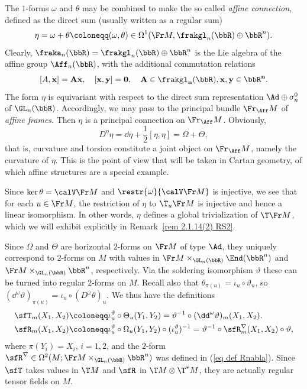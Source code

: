 \begin{rem}\label{rem 2.1.14(1) RS2}
    The $1$-forms $\omega$ and $\theta$  may be combined to make the so called \emph{affine connection}, defined as the direct sum (usually written as a regular sum)
    \[\eta=\omega+\theta\coloneqq (\omega,\theta)\in \Omega^1(\Fr M,\frakgl_n(\bbR)\oplus\bbR^n).\]
    Clearly, $\fraka_n(\bbR)=\frakgl_n(\bbR)\oplus \bbR^n$ is the Lie algebra of the affine group $\Aff_n(\bbR)$, with the additional commutation relations
    \[[A,\bf{x}]=A\bf{x},\quad [\bf{x},\bf{y}]=0,\quad A\in\frakgl_n(\bbR),\bf{x},\bf{y}\in\bbR^n.\]
    The form $\eta$ is equivariant with respect to the direct sum representation $\Ad\oplus \sigma_n^0$ of $\GL_n(\bbR)$. Accordingly, we may pass to the principal bundle $\Fr_{\Aff} M$ of \emph{affine frames}. Then $\eta$ is a principal connection on $\Fr_{\Aff}M$. Obviously,
    \[D^\eta\eta=\dd \eta+\frac12[\eta,\eta]=\Omega+\Theta,\]
    that is, curvature and torsion constitute a joint object on $\Fr_{\Aff} M$, namely the curvature of $\eta$. This is the point of view that will be taken in Cartan geometry, of which affine structures are a special example.

    Since $\ker\theta=\calV \Fr M$ and $\restr{\omega}{\calV \Fr M}$ is injective, we see that for each $u\in\Fr M$, the restriction of $\eta$ to $\T_u \Fr M$ is injective and hence a linear isomorphism. In other words, $\eta$ defines a global trivialization of $\T\Fr M$, which we will exhibit explicitly in Remark~\ref{rem 2.1.14(2) RS2}.
\end{rem}

Since $\Omega$ and $\Theta$ are horizontal $2$-forms on $\Fr M$ of type $\Ad$, they uniquely correspond to $2$-forms on $M$ with values in $\Fr M\times_{\GL_n(\bbR)}\End(\bbR^n)$ and $\Fr M\times_{\GL_n(\bbR)}\bbR^n$, respectively. Via the soldering isomorphism $\vartheta$ these can be turned into regular $2$-forms on $M$. Recall also that $\theta_{\pi(u)}=\iota_u\circ \vartheta_u$, so $(\dd^\omega \vartheta)_{\pi(u)}=\iota_u\circ (D^\omega\theta)_u$. We thus have the definitions
\begin{align}
    \sfT_m(X_1,X_2)\coloneqq &\iota_u^\vartheta\circ \Theta_u(Y_1,Y_2)=\vartheta^{-1}\circ (\dd^\omega \vartheta)_m(X_1,X_2).\\
    \sfR_m(X_1,X_2)\coloneqq & \iota_u^\vartheta\circ \Omega_u(Y_1,Y_2)\circ (\iota_u^\vartheta)^{-1}=\vartheta^{-1}\circ \sfR^\nabla_m(X_1,X_2)\circ \vartheta,
\end{align}
where $\pi(Y_i)=X_i$, $i=1,2$, and the $2$-form $\sfR^\nabla\in\Omega^2(M;\Fr M\times_{\GL_n(\bbR)}\bbR^n)$ was defined in (\ref{eq def Rnabla}). Since $\sfT$ takes values in $\T M$ and $\sfR$ in $\T M\otimes \T^\ast M$, they are actually regular tensor fields on $M$.

